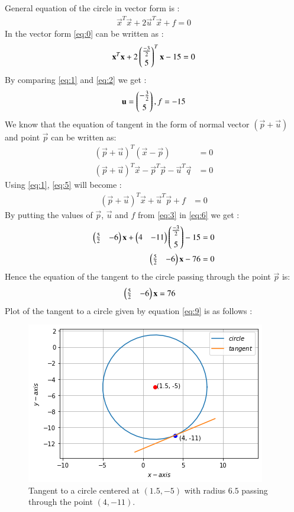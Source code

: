 \documentclass[journal,12pt,twocolumn]{IEEEtran}
\begin{document}
General equation of the circle in vector form is :
\begin{align}
\vec{x}^T\vec{x}+2\vec{u}^T\vec{x}+f=0\label{eq:1}
\end{align}
In the vector form \eqref{eq:0} can be written as :
\begin{align}
\mathbf{x}^T\mathbf{x}+2\begin{pmatrix}\frac{-3}{2}\\[0.1 cm]5\end{pmatrix}^T\mathbf{x}-15=0\label{eq:2}
\end{align}
By comparing \eqref{eq:1} and \eqref{eq:2} we get : 
\begin{align}
    \mathbf{u}=\begin{pmatrix}-\frac{3}{2}\\[0.1 cm]5\end{pmatrix},f=-15\label{eq:3}
\end{align}
We know that the equation of tangent in the form of normal vector $(\vec{p}+\vec{u})$ and point $\vec{p}$ can be written as:
\begin{align}
    (\vec{p}+\vec{u})^T(\vec{x}-\vec{p})&=0\\
    (\vec{p}+\vec{u})^T\vec{x}-\vec{p}^T\vec{p}-\vec{u}^T\vec{q}&=0\label{eq:5}
\end{align}
Using \eqref{eq:1}, \eqref{eq:5} will become : 
\begin{align}
    (\vec{p}+\vec{u})^T\vec{x}+\vec{u}^T\vec{p}+f&=0\label{eq:6}
\end{align}
By putting the values of $\vec{p}$, $\vec{u}$ and $f$ from \eqref{eq:3} in \eqref{eq:6} we get : 
\begin{align}
    \begin{pmatrix}\frac{5}{2}&-6\end{pmatrix}\mathbf{x}+\begin{pmatrix}4&-11\end{pmatrix}\begin{pmatrix}\frac{-3}{2}\\[0.2cm]5\end{pmatrix}-15&=0\\
    \begin{pmatrix}\frac{5}{2}&-6\end{pmatrix}\mathbf{x}-76&=0
\end{align}
Hence the equation of the tangent to the circle passing through the point $\vec{p}$ is:
\begin{align}
    \begin{pmatrix}\frac{5}{2}&-6\end{pmatrix}\mathbf{x}&=76\label{eq:9}
\end{align}
Plot of the tangent to a circle given by equation \eqref{eq:9} is as follows :
\begin{figure}[h]
\centering
    \includegraphics[width=\columnwidth]{tangent.png}
    \caption{Tangent to a circle centered at $(1.5, -5)$ with radius $6.5$ passing through the point $(4,-11)$.}
    \label{tangent}
\end{figure}
\end{document}
